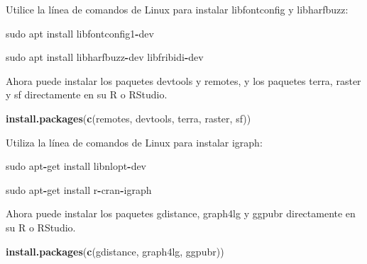 \documentclass[
]{book}
\newenvironment{Shaded}{\begin{snugshade}}{\end{snugshade}}
\newcommand{\FunctionTok}[1]{\textcolor[rgb]{0.13,0.29,0.53}{\textbf{#1}}}
\newcommand{\NormalTok}[1]{#1}
\newcommand{\SpecialCharTok}[1]{\textcolor[rgb]{0.81,0.36,0.00}{\textbf{#1}}}
\newcommand{\StringTok}[1]{\textcolor[rgb]{0.31,0.60,0.02}{#1}}
\begin{document}
Utilice la línea de comandos de Linux para instalar libfontconfig y
libharfbuzz:

\begin{Shaded}
\begin{Highlighting}[]
\NormalTok{sudo apt install libfontconfig1}\SpecialCharTok{{-}}\NormalTok{dev}

\NormalTok{sudo apt install libharfbuzz}\SpecialCharTok{{-}}\NormalTok{dev libfribidi}\SpecialCharTok{{-}}\NormalTok{dev}
\end{Highlighting}
\end{Shaded}

Ahora puede instalar los paquetes devtools y remotes, y los paquetes
terra, raster y sf directamente en su R o RStudio.

\begin{Shaded}
\begin{Highlighting}[]
\FunctionTok{install.packages}\NormalTok{(}\FunctionTok{c}\NormalTok{(}\StringTok{\textquotesingle{}remotes\textquotesingle{}}\NormalTok{, }\StringTok{\textquotesingle{}devtools\textquotesingle{}}\NormalTok{, }\StringTok{\textquotesingle{}terra\textquotesingle{}}\NormalTok{, }\StringTok{\textquotesingle{}raster\textquotesingle{}}\NormalTok{, }\StringTok{\textquotesingle{}sf\textquotesingle{}}\NormalTok{))}
\end{Highlighting}
\end{Shaded}

Utiliza la línea de comandos de Linux para instalar igraph:

\begin{Shaded}
\begin{Highlighting}[]
\NormalTok{sudo apt}\SpecialCharTok{{-}}\NormalTok{get install libnlopt}\SpecialCharTok{{-}}\NormalTok{dev}

\NormalTok{sudo apt}\SpecialCharTok{{-}}\NormalTok{get install r}\SpecialCharTok{{-}}\NormalTok{cran}\SpecialCharTok{{-}}\NormalTok{igraph}
\end{Highlighting}
\end{Shaded}

Ahora puede instalar los paquetes gdistance, graph4lg y ggpubr
directamente en su R o RStudio.

\begin{Shaded}
\begin{Highlighting}[]
\FunctionTok{install.packages}\NormalTok{(}\FunctionTok{c}\NormalTok{(}\StringTok{\textquotesingle{}gdistance\textquotesingle{}}\NormalTok{, }\StringTok{\textquotesingle{}graph4lg\textquotesingle{}}\NormalTok{, }\StringTok{\textquotesingle{}ggpubr\textquotesingle{}}\NormalTok{))}
\end{Highlighting}
\end{Shaded}
\end{document}
